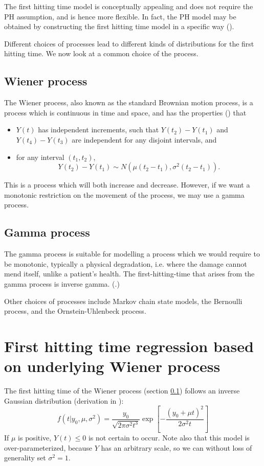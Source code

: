 The first hitting time model is conceptually appealing  and does not require the PH assumption, and is hence more flexible. In fact, the PH model may be obtained by constructing the first hitting time model in a specific way (\cite{lee2010}).

Different choices of processes lead to different kinds of distributions for the first hitting time. We now look at a common choice of the process.

\subsection{Wiener process}\label{sec:wiener}
The Wiener process, also known as the standard Brownian motion process, is a process which is continuous in time and space, and has the properties (\cite[61]{caroni2017}) that
\begin{itemize}
    \item $Y(t)$ has independent increments, such that $Y(t_2)-Y(t_1)$ and $Y(t_4)-Y(t_3)$ are independent for any disjoint intervals, and
    \item for any interval $(t_1, t_2)$,
    \[
        Y(t_2)-Y(t_1)\sim N(\mu(t_2-t_1), \sigma^2(t_2-t_1)).
    \]
\end{itemize}
This is a process which will both increase and decrease. However, if we want a monotonic restriction on the movement of the process, we may use a gamma process.

\subsection{Gamma process}
The gamma process is suitable for modelling a process which we would require to be monotonic, typically a physical degradation, i.e. where the damage cannot mend itself, unlike a patient's health. The first-hitting-time that arises from the gamma process is inverse gamma. (\cite[503]{lee2006}.)


Other choices of processes include Markov chain state models, the Bernoulli process, and the Ornstein-Uhlenbeck process.

\section{First hitting time regression based on underlying Wiener process}
The first hitting time of the Wiener process (section \ref{sec:wiener}) follows an inverse Gaussian distribution (derivation in \cite[23-29]{chhikara1988}):
\begin{equation}
\label{eq:fht-ig}
    f(t|y_0,\mu,\sigma^2)=\frac{y_0}{\sqrt{2\pi\sigma^2t^3}}\exp\left[-\frac{(y_0+\mu t)^2}{2\sigma^2t}\right]
\end{equation}
If $\mu$ is positive, $Y(t)\leq 0$ is not certain to occur. Note also that this model is over-parameterized, because $Y$ has an arbitrary scale, so we can without loss of generality set $\sigma^2=1$.

